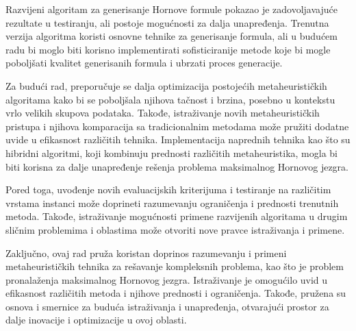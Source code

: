 \documentclass[12pt,oneside]{memoir}
\begin{document}
Razvijeni algoritam za generisanje Hornove formule pokazao je zadovoljavajuće rezultate u testiranju, ali postoje mogućnosti za dalja unapređenja. Trenutna verzija algoritma koristi osnovne tehnike za generisanje formula, ali u budućem radu bi moglo biti korisno implementirati sofisticiranije metode koje bi mogle poboljšati kvalitet generisanih formula i ubrzati proces generacije.

Za budući rad, preporučuje se dalja optimizacija postojećih metaheurističkih algoritama kako bi se poboljšala njihova tačnost i brzina, posebno u kontekstu vrlo velikih skupova podataka. Takođe, istraživanje novih metaheurističkih pristupa i njihova komparacija sa tradicionalnim metodama može pružiti dodatne uvide u efikasnost različitih tehnika. Implementacija naprednih tehnika kao što su hibridni algoritmi, koji kombinuju prednosti različitih metaheuristika, mogla bi biti korisna za dalje unapređenje rešenja problema maksimalnog Hornovog jezgra.

Pored toga, uvođenje novih evaluacijskih kriterijuma i testiranje na različitim vrstama instanci može doprineti razumevanju ograničenja i prednosti trenutnih metoda. Takođe, istraživanje mogućnosti primene razvijenih algoritama u drugim sličnim problemima i oblastima može otvoriti nove pravce istraživanja i primene.

Zaključno, ovaj rad pruža koristan doprinos razumevanju i primeni metaheurističkih tehnika za rešavanje kompleksnih problema, kao što je problem pronalaženja maksimalnog Hornovog jezgra. Istraživanje je omogućilo uvid u efikasnost različitih metoda i njihove prednosti i ograničenja. Takođe, pružena su osnova i smernice za buduća istraživanja i unapređenja, otvarajući prostor za dalje inovacije i optimizacije u ovoj oblasti.

% 


\literatura

\backmatter
\end{document}
